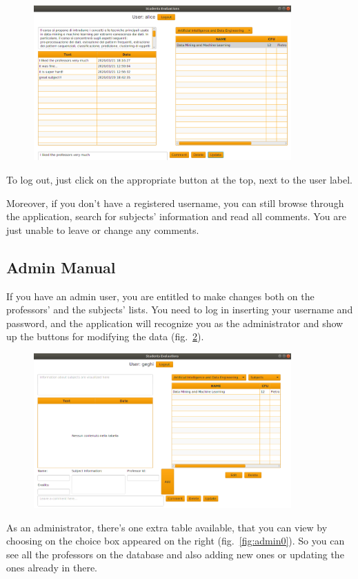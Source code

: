 \documentclass[a4paper]{article}
\begin{document}
\begin{figure}[h]
\centering
\includegraphics[width=0.88\textwidth]{images/screens/screen5}
\label{fig:screen5}
\end{figure}

To log out, just click on the appropriate button at the top, next to the user label.

Moreover, if you don't have a registered username, you can still browse through the application, search for subjects' information and read all comments. You are just unable to leave or change any comments.

\clearpage
\subsection{Admin Manual}
If you have an admin user, you are entitled to make changes both on the professors' and the subjects' lists. You need to log in inserting your username and password, and the application will recognize you as the administrator and show up the buttons for modifying the data (fig.~\ref{fig:adminLogin}).

\begin{figure}[h]
\centering
\includegraphics[width=0.88\textwidth]{images/screens/adminLogin}
\label{fig:adminLogin}
\end{figure}
As an administrator, there's one extra table available, that you can view by choosing on the choice box appeared on the right (fig.~\ref{fig:admin0}). So you can see all the professors on the database and also adding new ones or updating the ones already in there.
\end{document}
